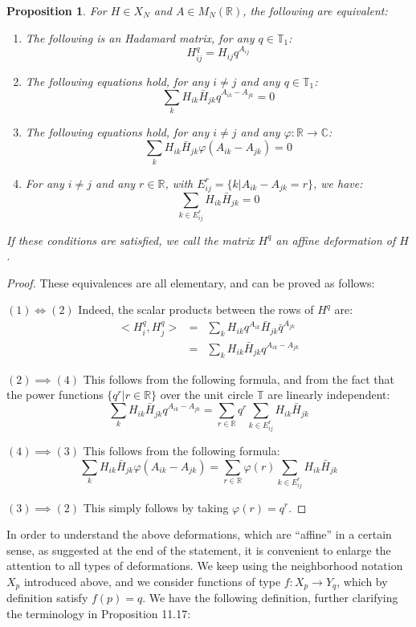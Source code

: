 \documentclass[12pt]{amsbook}
\newtheorem{proposition}[theorem]{Proposition}
\begin{document}
\begin{proposition}
For $H\in X_N$ and $A\in M_N(\mathbb R)$, the following are equivalent:
\begin{enumerate}
\item The following is an Hadamard matrix, for any $q\in\mathbb T_1$:
$$H_{ij}^q=H_{ij}q^{A_{ij}}$$

\item The following equations hold, for any $i\neq j$ and any $q\in\mathbb T_1$:
$$\sum_kH_{ik}\bar{H}_{jk}q^{A_{ik}-A_{jk}}=0$$

\item The following equations hold, for any $i\neq j$ and any $\varphi:\mathbb R\to\mathbb C$:
$$\sum_kH_{ik}\bar{H}_{jk}\varphi(A_{ik}-A_{jk})=0$$

\item For any $i\neq j$ and any $r\in\mathbb R$, with $E_{ij}^r=\{k|A_{ik}-A_{jk}=r\}$, we have:
$$\sum_{k\in E_{ij}^r}H_{ik}\bar{H}_{jk}=0$$
\end{enumerate}
If these conditions are satisfied, we call the matrix $H^q$ an affine deformation of $H$.
\end{proposition}

\begin{proof}
These equivalences are all elementary, and can be proved as follows:

\medskip

$(1)\iff(2)$ Indeed, the scalar products between the rows of $H^q$ are:
\begin{eqnarray*}
<H^q_i,H^q_j>
&=&\sum_kH_{ik}q^{A_{ik}}\bar{H}_{jk}\bar{q}^{A_{jk}}\\
&=&\sum_kH_{ik}\bar{H}_{jk}q^{A_{ik}-A_{jk}}
\end{eqnarray*}

$(2)\implies(4)$ This follows from the following formula, and from the fact that the power functions $\{q^r|r\in\mathbb R\}$ over the unit circle $\mathbb T$ are linearly independent:
$$\sum_kH_{ik}\bar{H}_{jk}q^{A_{ik}-A_{jk}}=\sum_{r\in\mathbb R}q^r\sum_{k\in E_{ij}^r}H_{ik}\bar{H}_{jk}$$

$(4)\implies(3)$ This follows from the following formula:
$$\sum_kH_{ik}\bar{H}_{jk}\varphi(A_{ik}-A_{jk})=\sum_{r\in\mathbb R}\varphi(r)\sum_{k\in E_{ij}^r}H_{ik}\bar{H}_{jk}$$

$(3)\implies(2)$ This simply follows by taking $\varphi(r)=q^r$.
\end{proof}

In order to understand the above deformations, which are ``affine'' in a certain sense, as suggested at the end of the statement, it is convenient to enlarge the attention to all types of deformations. We keep using the neighborhood notation $X_p$ introduced above, and we consider functions of type $f:X_p\to Y_q$, which by definition satisfy $f(p)=q$. We have the following definition, further clarifying the terminology in Proposition 11.17:
\end{document}
